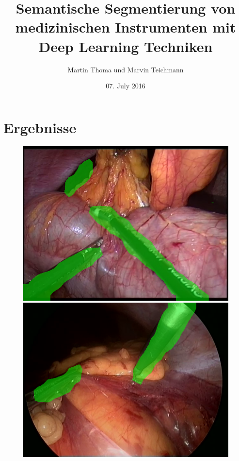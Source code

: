\documentclass{beamer}
\begin{document}
\title{Semantische Segmentierung von medizinischen Instrumenten mit Deep Learning Techniken}
\author{Martin Thoma und Marvin Teichmann}
\date{07. July 2016}
\subject{Computer Science}


\section{Ergebnisse}
\begin{frame}[plain]{}

\begin{figure}[ht]
    \begin{minipage}[b]{0.45\linewidth}
        \centering
        \includegraphics*[width=\linewidth, keepaspectratio]{7-img_07.png}
    \end{minipage}
    \hspace{0.5cm}
    \begin{minipage}[b]{0.45\linewidth}
        \centering
        \includegraphics*[width=\linewidth, keepaspectratio]{115-img_25.png}
    \end{minipage}
\end{figure}



\end{frame}
\end{document}
